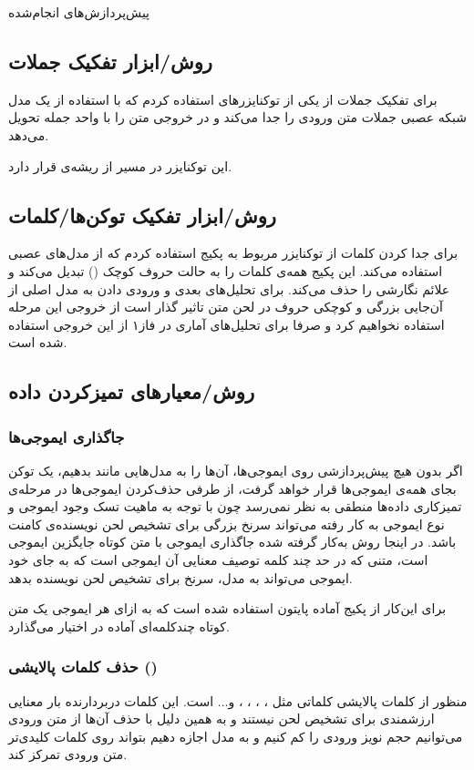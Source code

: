 \Section
{پیش‌پرداز‌ش‌های انجام‌شده}
{
\subsection{روش/ابزار تفکیک جملات}
{
برای تفکیک جملات از یکی از توکنایزرهای 
استفاده کردم که با استفاده از یک مدل شبکه عصبی جملات متن ورودی را جدا می‌کند و در خروجی متن را با واحد جمله تحویل می‌دهد.

این توکنایزر در مسیر 
از ریشه‌ی 
قرار دارد.
}
\subsection{روش/ابزار تفکیک توکن‌ها/کلمات}
{
برای جدا کردن کلمات از توکنایزر مربوط به پکیج 
استفاده کردم که از مدل‌های عصبی استفاده می‌کند. این پکیج همه‌ی کلمات را به حالت حروف کوچک ()
تبدیل می‌کند و علائم نگارشی را حذف می‌کند. برای تحلیل‌های بعدی و ورودی دادن به مدل اصلی از آن‌جایی بزرگی و کوچکی حروف در لحن متن تاثیر گذار است از خروجی این مرحله استفاده نخواهیم کرد و صرفا برای تحلیل‌های آماری در فاز۱ از این خروجی استفاده شده است.
}

\subsection{روش/معیارهای تمیزکردن داده}
{ 
\subsubsection{\Large جاگذاری ایموجی‌ها}
{
اگر بدون هیچ‌ پیش‌پردازشی روی ایموجی‌ها، آن‌ها را به مدل‌هایی مانند
بدهیم، یک توکن  
بجای همه‌ی ایموجی‌ها قرار خواهد گرفت، از طرفی حذف‌کردن ایموجی‌ها در مرحله‌ی تمیزکاری داده‌ها منطقی به نظر نمی‌رسد چون با توجه به ماهیت تسک 
وجود ایموجی و نوع ایموجی به‌ کار رفته می‌تواند سرنخ بزرگی برای تشخیص لحن نویسنده‌ی کامنت باشد. در اینجا روش به‌کار گرفته شده جاگذاری ایموجی با متن کوتاه جایگزین ایموجی است، متنی که در حد چند کلمه توصیف معنایی آن ایموجی است که به جای خود ایموجی می‌تواند به مدل، سرنخ برای تشخیص لحن نویسنده بدهد.

برای این‌کار از پکیج آماده  پایتون استفاده شده است که به ازای هر ایموجی یک متن کوتاه چندکلمه‌ای آماده در اختیار می‌گذارد.
}
\subsubsection{\Large حذف کلمات پالایشی ()}
{
منظور از کلمات پالایشی کلماتی مثل 
،
،
،
،
و... است.
این کلمات دربردارنده بار معنایی ارزشمندی برای تشخیص لحن نیستند و به همین دلیل با حذف آن‌ها از متن ورودی می‌توانیم حجم نویز ورودی را کم کنیم و به مدل اجازه دهیم بتواند روی کلمات کلیدی‌تر متن ورودی تمرکز کند.

}}}
